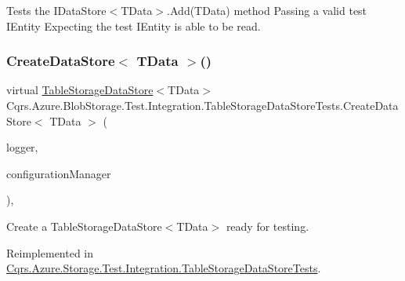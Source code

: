 Tests the I\+Data\+Store$<$\+T\+Data$>$.\+Add(\+T\+Data) method Passing a valid test I\+Entity Expecting the test I\+Entity is able to be read. 

\mbox{\label{classCqrs_1_1Azure_1_1BlobStorage_1_1Test_1_1Integration_1_1TableStorageDataStoreTests_a76d6ef854f24e39f80de66e86cfa967c_a76d6ef854f24e39f80de66e86cfa967c}} 
\subsubsection{\texorpdfstring{Create\+Data\+Store$<$ T\+Data $>$()}{CreateDataStore< TData >()}}
{\footnotesize\ttfamily virtual \hyperlink{classCqrs_1_1Azure_1_1BlobStorage_1_1DataStores_1_1TableStorageDataStore}{Table\+Storage\+Data\+Store}$<$T\+Data$>$ Cqrs.\+Azure.\+Blob\+Storage.\+Test.\+Integration.\+Table\+Storage\+Data\+Store\+Tests.\+Create\+Data\+Store$<$ T\+Data $>$ (\begin{DoxyParamCaption}\item[{I\+Logger}]{logger,  }\item[{\hyperlink{interfaceCqrs_1_1Configuration_1_1IConfigurationManager}{I\+Configuration\+Manager}}]{configuration\+Manager }\end{DoxyParamCaption})\hspace{0.3cm}{\ttfamily [protected]}, {\ttfamily [virtual]}}



Create a Table\+Storage\+Data\+Store$<$\+T\+Data$>$ ready for testing. 



Reimplemented in \hyperlink{classCqrs_1_1Azure_1_1Storage_1_1Test_1_1Integration_1_1TableStorageDataStoreTests_a4c23960b33f58ea56707d736616a9f53_a4c23960b33f58ea56707d736616a9f53}{Cqrs.\+Azure.\+Storage.\+Test.\+Integration.\+Table\+Storage\+Data\+Store\+Tests}.

